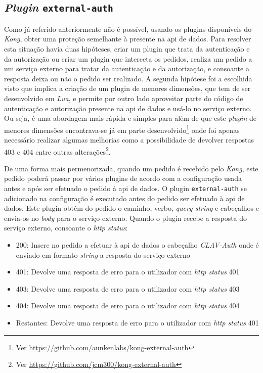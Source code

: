 \subsection{\textit{Plugin} \texttt{external-auth}}
Como já referido anteriormente não é possível, usando os plugins disponíveis do \textit{Kong}, obter uma proteção semelhante à presente na \acrshort{api} de dados. Para resolver esta situação havia duas hipóteses, criar um plugin que trata da autenticação e da autorização ou criar um plugin que interceta os pedidos, realiza um pedido a um serviço externo para tratar da autenticação e da autorização, e consoante a resposta deixa ou não o pedido ser realizado. A segunda hipótese foi a escolhida visto que implica a criação de um plugin de menores dimensões, que tem de ser desenvolvido em \textit{Lua}, e permite por outro lado aproveitar parte do código de autenticação e autorização presente na \acrshort{api} de dados e usá-lo no serviço externo. Ou seja, é uma abordagem mais rápida e simples para além de que este \textit{plugin} de menores dimensões encontrava-se já em parte desenvolvido\footnote{Ver \url{https://github.com/aunkenlabs/kong-external-auth}} onde foi apenas necessário realizar algumas melhorias como a possibilidade de devolver respostas 403 e 404 entre outras alterações\footnote{Ver \url{https://github.com/jcm300/kong-external-auth}}.

De uma forma mais permenorizada, quando um pedido é recebido pelo \textit{Kong}, este pedido poderá passar por vários plugins de acordo com a configuração usada antes e após ser efetuado o pedido à \acrshort{api} de dados. O plugin \texttt{external-auth} se adicionado na configuração é executado antes do pedido ser efetuado à \acrshort{api} de dados. Este plugin obtém do pedido o caminho, verbo, \textit{query string} e cabeçalhos e envia-os no \textit{body} para o serviço externo. Quando o plugin recebe a resposta do serviço externo, consoante o \textit{\acrshort{http} status}:
\begin{itemize}
    \item 200: Insere no pedido a efetuar à \acrshort{api} de dados o cabeçalho \textit{CLAV-Auth} onde é enviado em formato \textit{string} a resposta do serviço externo
    \item 401: Devolve uma resposta de erro para o utilizador com \textit{\acrshort{http} status} 401
    \item 403: Devolve uma resposta de erro para o utilizador com \textit{\acrshort{http} status} 403
    \item 404: Devolve uma resposta de erro para o utilizador com \textit{\acrshort{http} status} 404
    \item Restantes: Devolve uma resposta de erro para o utilizador com \textit{\acrshort{http} status} 401

\end{itemize}

